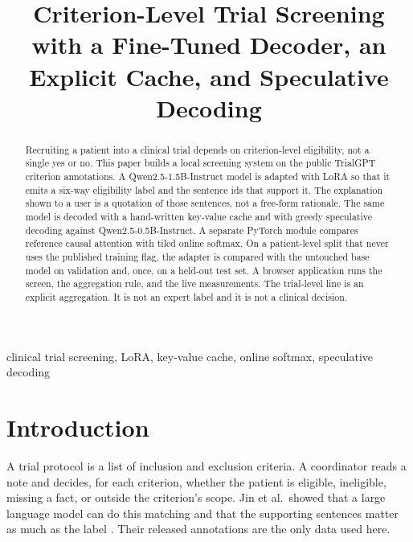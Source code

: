 \documentclass[conference]{IEEEtran}
\begin{document}
\title{Criterion-Level Trial Screening with a Fine-Tuned Decoder, an Explicit Cache, and Speculative Decoding}

\author{
}

\maketitle

\begin{abstract}
Recruiting a patient into a clinical trial depends on criterion-level eligibility, not a single yes or no.
This paper builds a local screening system on the public TrialGPT criterion annotations.
A Qwen2.5-1.5B-Instruct model is adapted with LoRA so that it emits a six-way eligibility label and the sentence ids that support it.
The explanation shown to a user is a quotation of those sentences, not a free-form rationale.
The same model is decoded with a hand-written key-value cache and with greedy speculative decoding against Qwen2.5-0.5B-Instruct.
A separate PyTorch module compares reference causal attention with tiled online softmax.
On a patient-level split that never uses the published training flag, the adapter is compared with the untouched base model on validation and, once, on a held-out test set.
A browser application runs the screen, the aggregation rule, and the live measurements.
The trial-level line is an explicit aggregation. It is not an expert label and it is not a clinical decision.
\end{abstract}

\begin{IEEEkeywords}
clinical trial screening, LoRA, key-value cache, online softmax, speculative decoding
\end{IEEEkeywords}

\section{Introduction}
A trial protocol is a list of inclusion and exclusion criteria.
A coordinator reads a note and decides, for each criterion, whether the patient is eligible, ineligible, missing a fact, or outside the criterion's scope.
Jin et al.\ showed that a large language model can do this matching and that the supporting sentences matter as much as the label \cite{jin2024trialgpt}.
Their released annotations are the only data used here.
\end{document}
